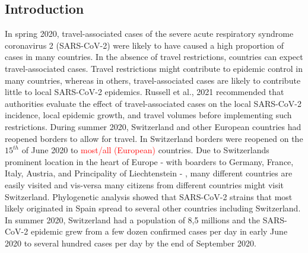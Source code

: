 \documentclass[10pt, a4paper, twoside]{article}
\begin{document}
\begin{multicols}{2}
\section{Introduction}
In spring 2020, travel-associated cases of the severe acute respiratory syndrome coronavirus 2 (SARS-CoV-2) were likely to have caused a high proportion of cases in many countries.\cite{russell_effect_2021} 
In the absence of travel restrictions, countries can expect travel-associated cases.\cite{russell_effect_2021} 
Travel restrictions might contribute to epidemic control in many countries, whereas in others, travel-associated cases are likely to contribute little to local SARS-CoV-2 epidemics.\cite{russell_effect_2021}  
Russell et al., 2021 recommended that authorities evaluate the effect of travel-associated cases on the local SARS-CoV-2 incidence, local epidemic growth, and travel volumes before implementing such restrictions.\cite{russell_effect_2021} 
During summer 2020, Switzerland and other European countries had reopened borders to allow for travel. 
In Switzerland borders were reopened on the $15^{th}$ of June 2020 to \textcolor{red}{most/all (European)} countries. 
Due to Switzerlands prominent location in the heart of Europe - with boarders to Germany, France, Italy, Austria, and Principality of Liechtenstein - , many different countries are easily visited and vis-versa many citizens from different countries might visit Switzerland. 
Phylogenetic analysis showed that SARS-CoV-2 strains that most likely originated in Spain spread to several other countries including Switzerland.\cite{hodcroft_emergence_2020}
In summer 2020, Switzerland had a population of 8,5 millions and the SARS-CoV-2 epidemic grew from a few dozen confirmed cases per day in early June 2020 to several hundred cases per day by the end of September 2020. 



\end{multicols}
\end{document}
